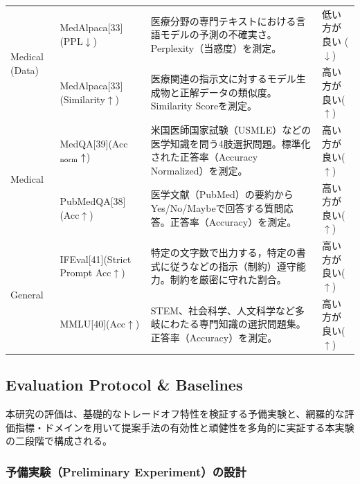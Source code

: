 \documentclass{article}
\begin{document}
\begin{table}[H]
\begin{tabularx}{\textwidth}{p{2.0cm}p{3.3cm}Xp{2.2cm}}
\midrule
\multirow{2}{*}{Medical (Data)}
& MedAlpaca[33](PPL$\downarrow$) & 医療分野の専門テキストにおける言語モデルの予測の不確実さ。Perplexity（当惑度）を測定。 & 低い方が良い ($\downarrow$) \\
& MedAlpaca[33](Similarity$\uparrow$) & 医療関連の指示文に対するモデル生成物と正解データの類似度。Similarity Scoreを測定。 & 高い方が良い($\uparrow$) \\
\midrule
\multirow{2}{*}{Medical}
& MedQA[39](Acc$_{\rm norm}\uparrow$) & 米国医師国家試験（USMLE）などの医学知識を問う4肢選択問題。標準化された正答率（Accuracy Normalized）を測定。 & 高い方が良い($\uparrow$) \\
& PubMedQA[38](Acc$\uparrow$) & 医学文献（PubMed）の要約からYes/No/Maybeで回答する質問応答。正答率（Accuracy）を測定。 & 高い方が良い($\uparrow$) \\
\midrule
\multirow{2}{*}{General}
& IFEval[41](Strict Prompt Acc$\uparrow$) & 特定の文字数で出力する，特定の書式に従うなどの指示（制約）遵守能力。制約を厳密に守れた割合。 & 高い方が良い($\uparrow$) \\
& MMLU[40](Acc$\uparrow$) & STEM、社会科学、人文科学など多岐にわたる専門知識の選択問題集。正答率（Accuracy）を測定。 & 高い方が良い($\uparrow$) \\
\bottomrule
\end{tabularx}
\end{table}


\subsection{Evaluation Protocol \& Baselines}

本研究の評価は、基礎的なトレードオフ特性を検証する予備実験と、網羅的な評価指標・ドメインを用いて提案手法の有効性と頑健性を多角的に実証する本実験の二段階で構成される。

\subsubsection{予備実験（Preliminary Experiment）の設計}
\end{document}
